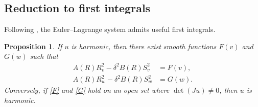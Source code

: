 \documentclass[12pt]{amsart}
\newtheorem{proposition}[theorem]{Proposition}
\begin{document}
\subsection{Reduction to first integrals}

Following \cite{FotDask2}, the Euler--Lagrange system admits useful
first integrals.

\begin{proposition}\label{FandG}
If $u$ is harmonic, then there exist smooth functions
$F(v)$ and $G(w)$ such that
\begin{align}
A(R) R_v^{2} - \delta^{2} B(R) S_v^{2} &= F(v), \label{F} \\
A(R) R_w^{2} - \delta^{2} B(R) S_w^{2} &= G(w). \label{G}
\end{align}
Conversely, if \eqref{F} and \eqref{G} hold on an open set where
$\det(Ju)\neq0$, then $u$ is harmonic.
\end{proposition}
\end{document}
